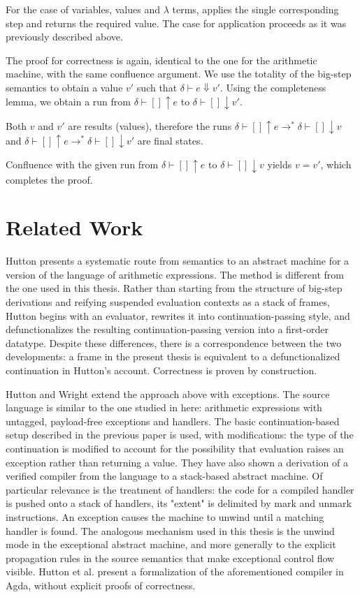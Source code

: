 For the case of variables, values and $\lambda$ terms, applies the single corresponding step and returns the required value.
The case for application proceeds as it was previously described above.

The proof for correctness is again, identical to the one for the arithmetic machine, with the same confluence argument.
We use the totality of the big-step semantics to obtain a value $v'$ such that $\delta \vdash e \Downarrow v'$. 
Using the completeness lemma, we obtain a run from $\delta \vdash [] \uparrow e$ to $\delta \vdash [] \downarrow v'$.

Both $v$ and $v'$ are results (values), therefore the runs $\delta \vdash [] \uparrow e \to^* \delta \vdash [] \downarrow v$ and $\delta \vdash [] \uparrow e \to^* \delta \vdash [] \downarrow v'$ are final states.

Confluence with the given run from $\delta \vdash [] \uparrow e$ to $\delta \vdash [] \downarrow v$ yields $v = v'$, which completes the proof.

\chapter{Related Work} %
Hutton \cite{easyas123} presents a systematic route from semantics to an abstract
machine for a version of the language of arithmetic expressions. The method is different from the one
used in this thesis. Rather than starting from the structure of big-step
derivations and reifying suspended evaluation contexts as a stack of frames, Hutton begins
with an evaluator, rewrites it into continuation-passing style, and
defunctionalizes the resulting continuation-passing version into a first-order datatype. 
Despite these differences, there is a correspondence between the two developments: a frame in 
the present thesis is equivalent to a defunctionalized continuation in Hutton's account. 
Correctness is proven by construction. 

Hutton and Wright \cite{calculatingexceptionalmachines} extend the approach above with exceptions. The source language is similar to the one studied in here: 
arithmetic expressions with untagged, payload-free exceptions  and handlers. The basic continuation-based setup described in the previous paper is used, with modifications:
the type of the continuation is modified to account for the possibility that evaluation raises an exception
rather than returning a value. They \cite{compilingexceptionscorrectly} have also shown a derivation of a verified compiler from the language to a stack-based abstract machine.
Of particular relevance is the treatment of handlers: the code for a compiled handler is pushed onto a stack of handlers, its "extent" is delimited by mark and unmark instructions.
An exception causes the machine to unwind until a matching handler is found. The analogous mechanism used in this thesis is the unwind mode in the exceptional abstract machine, and 
more generally to the explicit propagation rules in the source semantics that make exceptional control flow
visible. Hutton et al. \cite{calculatingdependentlytypedcompilers} present a formalization of the aforementioned compiler in Agda, without explicit proofs of correctness.



